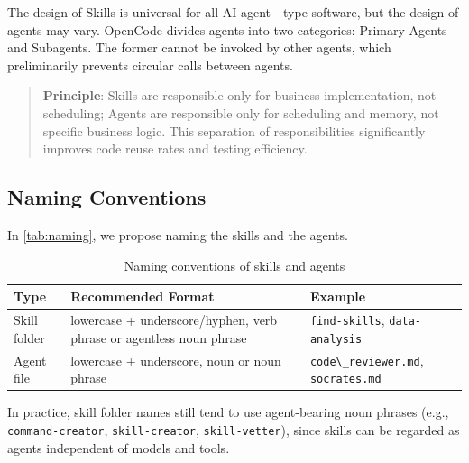 \documentclass[]{article}
\newcommand{\passthrough}[1]{#1}
\newcommand{\qe}[1]{\passthrough{\lstinline!#1!}}
\begin{document}
The design of Skills is universal for all AI agent - type software, but the design of agents may vary. OpenCode divides agents into two categories: Primary Agents and
Subagents. The former cannot be invoked by other agents, which
preliminarily prevents circular calls between agents.

\begin{quote}
\textbf{Principle}: Skills are responsible only for business
implementation, not scheduling; Agents are responsible only for
scheduling and memory, not specific business logic. This separation of
responsibilities significantly improves code reuse rates and testing
efficiency.
\end{quote}

\subsection{Naming Conventions}\label{sec:naming-conventions}

In \autoref{tab:naming}, we propose naming the skills and the agents.

\begin{longtable}[]{@{}
  >{\raggedright\arraybackslash}p{}
  >{\raggedright\arraybackslash}p{}
  >{\raggedright\arraybackslash}p{}@{}}
\caption{Naming conventions of skills and agents}
\label{tab:naming}
\\
\toprule
\begin{minipage}[b]{\linewidth}\raggedright
Type
\end{minipage} & \begin{minipage}[b]{\linewidth}\raggedright
Recommended Format
\end{minipage} & \begin{minipage}[b]{\linewidth}\raggedright
Example
\end{minipage} \\
\midrule
\endhead
\bottomrule
\endlastfoot
Skill folder & lowercase + underscore/hyphen, verb phrase or agentless noun phrase & \qe{find-skills}, \qe{data-analysis} \\
Agent file & lowercase + underscore, noun or noun phrase & \qe{code\_reviewer.md}, \qe{socrates.md} \\
\end{longtable}

In practice, skill folder names still tend to use agent-bearing noun
phrases (e.g., \qe{command-creator}, \qe{skill-creator}, \qe{skill-vetter}), since skills can be regarded as
agents independent of models and tools.
\end{document}

